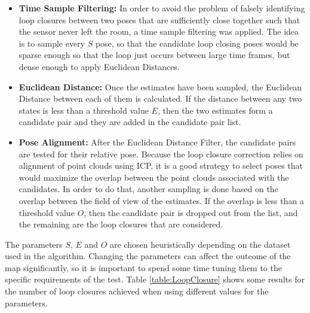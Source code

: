 \documentclass[11pt]{article}
\begin{document}
\begin{itemize}
\item \textbf{Time Sample Filtering:} In order to avoid the problem of falsely identifying loop closures between two poses that are sufficiently close together such that the sensor never left the room, a time sample filtering was applied. The idea is to sample every $S$ pose, so that the candidate loop closing poses would be sparse enough so that the loop just occurs between large time frames, but dense enough to apply Euclidean Distances.
\item \textbf{Euclidean Distance:} Once the estimates have been  sampled, the Euclidean Distance between each of them is calculated. If the distance between any two states is less than a threshold value $E$, then the two estimates form a candidate pair and they are added in the candidate pair list.
\item \textbf{Pose Alignment:} After the Euclidean Distance Filter, the candidate pairs are tested for their relative pose. Because the loop closure correction relies on alignment of point clouds using ICP, it is a good strategy to select poses that would maximize the overlap between the point clouds associated with the candidates. In order to do that, another sampling is done based on the overlap between the field of view of the estimates. If the overlap is less than a threshold value $O$, then the candidate pair is dropped out from the list, and the remaining are the loop closures that are considered.
\end{itemize}
	
The parameters $S$, $E$ and $O$ are chosen heuristically depending on the dataset used in the algorithm. Changing the parameters can affect the outcome of the map significantly, so it is important to spend some time tuning them to the specific requirements of the test. Table \ref{table:LoopClosure} shows some results for the number of loop closures achieved when using different values for the parameters.
\end{document}
